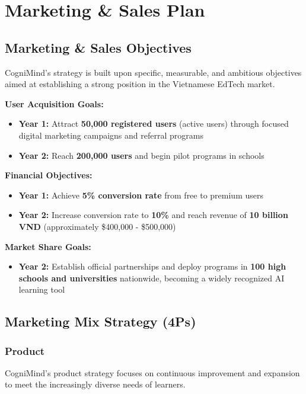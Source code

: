\section{Marketing \& Sales Plan}

\subsection{Marketing \& Sales Objectives}
CogniMind's strategy is built upon specific, measurable, and ambitious objectives aimed at establishing a strong position in the Vietnamese EdTech market.

\textbf{User Acquisition Goals:}
\begin{itemize}
    \item \textbf{Year 1:} Attract \textbf{50,000 registered users} (active users) through focused digital marketing campaigns and referral programs
    \item \textbf{Year 2:} Reach \textbf{200,000 users} and begin pilot programs in schools
\end{itemize}

\textbf{Financial Objectives:}
\begin{itemize}
    \item \textbf{Year 1:} Achieve \textbf{5\% conversion rate} from free to premium users
    \item \textbf{Year 2:} Increase conversion rate to \textbf{10\%} and reach revenue of \textbf{10 billion VND} (approximately \$400,000 - \$500,000)
\end{itemize}

\textbf{Market Share Goals:}
\begin{itemize}
    \item \textbf{Year 2:} Establish official partnerships and deploy programs in \textbf{100 high schools and universities} nationwide, becoming a widely recognized AI learning tool
\end{itemize}

\subsection{Marketing Mix Strategy (4Ps)}
\subsubsection{Product}
CogniMind's product strategy focuses on continuous improvement and expansion to meet the increasingly diverse needs of learners.

